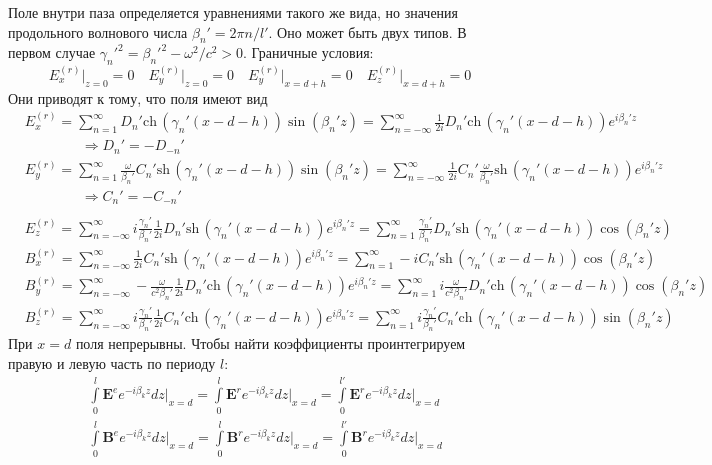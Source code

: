 \documentclass[a4paper,12pt]{extarticle} %
\renewcommand{\vec}[1]{\bm{#1}}
\renewcommand{\cosh}{\mathrm{ch}\,}
\renewcommand{\sinh}{\mathrm{sh}\,}
\begin{document}
Поле внутри паза определяется уравнениями такого же вида, но значения продольного волнового числа $\beta_n' = 2\pi n/l'$. Оно может быть двух типов. В первом случае $\gamma_n'^2 = \beta_n'^2 - {\omega^2}/{c^2} > 0$. Граничные условия:
\begin{equation*}
	E_{x}^{(r)} \Bigg|_{z = 0} = 0 \quad E_{y}^{(r)} \Bigg|_{z = 0} = 0 \quad E_{y}^{(r)} \Bigg|_{x = d + h} = 0 \quad E_{z}^{(r)} \Bigg|_{x = d + h} = 0
\end{equation*}
Они приводят к тому, что поля имеют вид
\begin{align*}
& E_{x}^{(r)} = 
\sum_{n = 1}^{\infty} D_n' \cosh (\gamma_n' (x - d - h)) \sin(\beta_n' z) = 
\sum_{n = -\infty}^{\infty} \frac{1}{2i} D_n' \cosh (\gamma_n' (x - d - h)) e^{i\beta_n' z} \\
& \qquad \qquad \Rightarrow D_n' = - D_{-n}' \\
& E_{y}^{(r)} = 
\sum_{n = 1}^{\infty} \frac{\omega}{\beta_n'} C_n' \sinh (\gamma_n' (x - d - h)) \sin(\beta_n' z) = 
\sum_{n = -\infty}^{\infty} \frac{1}{2i} C_n' \frac{\omega}{\beta_n'} \sinh (\gamma_n' (x - d - h)) e^{i\beta_n' z} \\
& \qquad \qquad\Rightarrow C_n' = - C_{-n}' \\
\end{align*}
\begin{align*}
& E_{z}^{(r)} = 
\sum_{n = -\infty}^{\infty} i \frac{\gamma_n'}{\beta_n'} \frac{1}{2i} D_n' \sinh (\gamma_n' (x - d - h)) e^{i\beta_n' z} = 
\sum_{n = 1}^{\infty} \frac{\gamma_n'}{\beta_n'} D_n' \sinh (\gamma_n' (x - d - h)) \cos(\beta_n' z) \\
& B_{x}^{(r)} = 
\sum_{n = -\infty}^{\infty} \frac{1}{2i} C_n' \sinh (\gamma_n' (x - d - h)) e^{i\beta_n' z} = 
\sum_{n = 1}^{\infty} - i C_n' \sinh (\gamma_n' (x - d - h)) \cos(\beta_n' z) \\
& B_{y}^{(r)} = 
\sum_{n = -\infty}^{\infty} - \frac{\omega}{c^2\beta_n'} \frac{1}{2i} D_n' \cosh (\gamma_n' (x - d - h)) e^{i\beta_n' z} =
\sum_{n = 1}^{\infty} i \frac{\omega}{c^2\beta_n'} D_n' \cosh (\gamma_n' (x - d - h)) \cos (\beta_n' z) \\
& B_{z}^{(r)} = 
\sum_{n = -\infty}^{\infty} i\frac{\gamma_n'}{\beta_n'} \frac{1}{2i} C_n' \cosh (\gamma_n' (x - d - h)) e^{i\beta_n' z} =
\sum_{n = 1}^{\infty} i\frac{\gamma_n'}{\beta_n'} C_n' \cosh (\gamma_n' (x - d - h)) \sin (\beta_n' z)
\end{align*}
При $x = d$ поля непрерывны. Чтобы найти коэффициенты проинтегрируем правую и левую часть по периоду $l$:
\begin{align*}
	& \int\limits_{0}^{l} \vec{E}^{e} e^{- i \beta_k z} dz \Bigg|_{x = d} = 
	\int\limits_{0}^{l} \vec{E}^{r} e^{- i \beta_k z} dz \Bigg|_{x = d} =
	\int\limits_{0}^{l'} \vec{E}^{r} e^{- i \beta_k z} dz \Bigg|_{x = d}\\
	& \int\limits_{0}^{l} \vec{B}^{e} e^{- i \beta_k z} dz \Bigg|_{x = d} = 
	\int\limits_{0}^{l} \vec{B}^{r} e^{- i \beta_k z} dz \Bigg|_{x = d} =
	\int\limits_{0}^{l'} \vec{B}^{r} e^{- i \beta_k z} dz \Bigg|_{x = d}
\end{align*}
\end{document}
